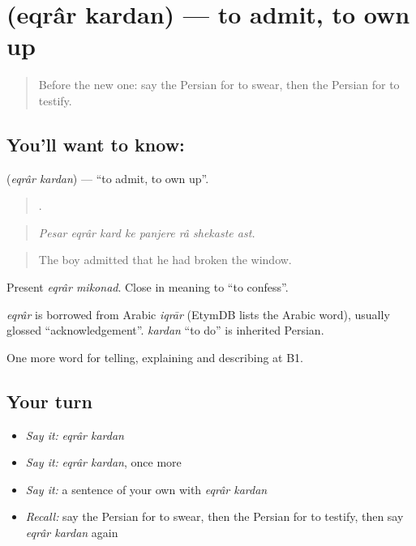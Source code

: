 \section[\texorpdfstring{\fa{اقرار} \fa{کردن} (eqrâr kardan)}{اقرار کردن (eqrâr kardan)}]{  (eqrâr kardan) — to admit, to own up}

\label{lesson:FA-C321-eqrar-kardan}



\begin{quote}
Before the new one: say the Persian for to swear, then the Persian for to testify.
\end{quote}

\subsection*{You'll want to know:  }
\textbf{ } (\emph{eqrâr kardan}) — \textquotedblleft{}to admit, to own up\textquotedblright{}.

\begin{quote}
       .
\end{quote}

\begin{quote}
\emph{Pesar eqrâr kard ke panjere râ shekaste ast.}
\end{quote}

\begin{quote}
The boy admitted that he had broken the window.
\end{quote}

Present \emph{eqrâr mikonad}. Close in meaning to \textquotedblleft{}to confess\textquotedblright{}.

\begin{cousinweb}
\emph{eqrâr} is borrowed from Arabic \emph{iqrār} (EtymDB lists the Arabic word), usually glossed \textquotedblleft{}acknowledgement\textquotedblright{}. \emph{kardan} \textquotedblleft{}to do\textquotedblright{} is inherited Persian.
\end{cousinweb}

\begin{grammarlens}[title={What you've built}]
One more word for telling, explaining and describing at B1.
\end{grammarlens}

\subsection*{Your turn}
\begin{itemize}
\raggedright
  \item \emph{Say it:} \emph{eqrâr kardan}
  \item \emph{Say it:} \emph{eqrâr kardan}, once more
  \item \emph{Say it:} a sentence of your own with \emph{eqrâr kardan}
  \item \emph{Recall:} say the Persian for to swear, then the Persian for to testify, then say \emph{eqrâr kardan} again
\end{itemize}

